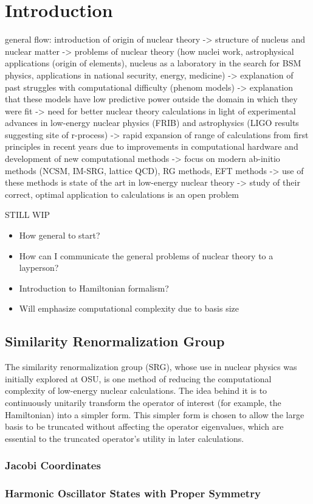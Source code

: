 \chapter{Introduction}

general flow: introduction of origin of nuclear theory -> structure of nucleus and nuclear matter -> problems of nuclear theory (how nuclei work, astrophysical applications (origin of elements), nucleus as a laboratory in the search for BSM physics, applications in national security, energy, medicine) -> explanation of past struggles with computational difficulty (phenom models) -> explanation that these models have low predictive power outside the domain in which they were fit -> need for better nuclear theory calculations in light of experimental advances in low-energy nuclear physics (FRIB) and astrophysics (LIGO results suggesting site of r-process) -> rapid expansion of range of calculations from first principles in recent years due to improvements in computational hardware and development of new computational methods -> focus on modern ab-initio methods (NCSM, IM-SRG, lattice QCD), RG methods, EFT methods -> use of these methods is state of the art in low-energy nuclear theory -> study of their correct, optimal application to calculations is an open problem


STILL WIP

\begin{itemize}
    \item{How general to start?}
    \item{How can I communicate the general problems of nuclear theory to a layperson?}
    \item{Introduction to Hamiltonian formalism?}
    \item{Will emphasize computational complexity due to basis size}
\end{itemize}


\section{Similarity Renormalization Group}

The similarity renormalization group (SRG), whose use in nuclear physics was initially explored at OSU, is one method of reducing the computational complexity of low-energy nuclear calculations. The idea behind it is to continuously unitarily transform the operator of interest (for example, the Hamiltonian) into a simpler form. This simpler form is chosen to allow the large basis to be truncated without affecting the operator eigenvalues, which are essential to the truncated operator's utility in later calculations.

\subsection{Jacobi Coordinates}

\subsection{Harmonic Oscillator States with Proper Symmetry}
